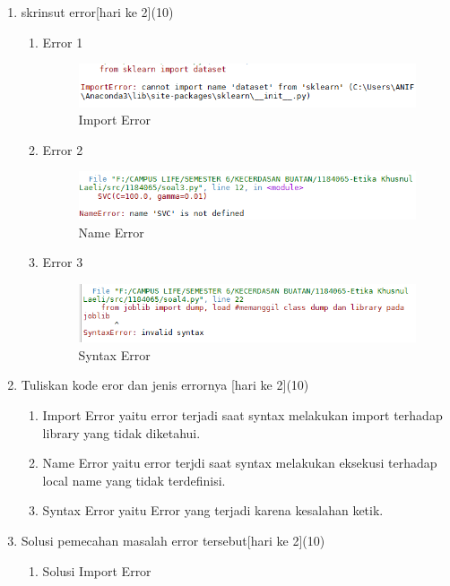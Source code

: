 \begin{enumerate}
	\item
	skrinsut error[hari ke 2](10)
	\begin{enumerate}
	\item Error 1
	\begin{figure}[H]
	\includegraphics[width=1\textwidth]{figures/1184065/error1.png}
	\centering
	\caption{Import Error}
\end{figure}
\item Error 2
\begin{figure}[H]
	\includegraphics[width=1\textwidth]{figures/1184065/error2.png}
	\centering
	\caption{Name Error}
	\end{figure}
	\item Error 3
	\begin{figure}[H]
	\includegraphics[width=1\textwidth]{figures/1184065/error3.png}
	\centering
	\caption{Syntax Error}
	\end{figure}
	\end{enumerate}
	\item
Tuliskan kode eror dan jenis errornya [hari ke 2](10)
\begin{enumerate}
\item Import Error yaitu error terjadi saat syntax melakukan import terhadap library yang tidak diketahui.
\item  Name Error yaitu error terjdi saat syntax melakukan eksekusi terhadap local name yang tidak terdefinisi.
\item Syntax Error yaitu Error yang terjadi karena kesalahan ketik.
\end{enumerate}
	\item
Solusi pemecahan masalah error tersebut[hari ke 2](10)
\begin{enumerate}
\item Solusi Import Error

\end{enumerate}
\end{enumerate}
